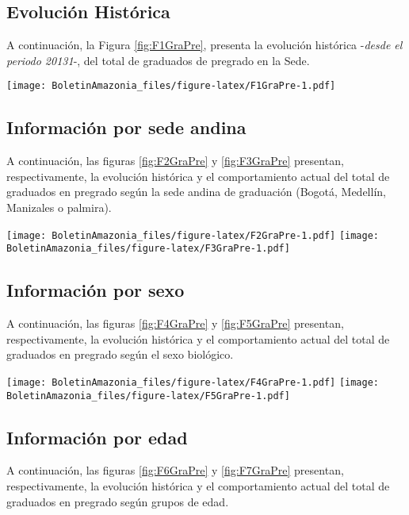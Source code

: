 \documentclass[
]{book}
\begin{document}
\hypertarget{evoluciuxf3n-histuxf3rica-8}{%
\subsection{Evolución Histórica}\label{evoluciuxf3n-histuxf3rica-8}}

A continuación, la Figura \ref{fig:F1GraPre}, presenta la evolución histórica -\emph{desde el periodo 20131}-, del total de graduados de pregrado en la Sede.

\texttt{[image: BoletinAmazonia\_files/figure-latex/F1GraPre-1.pdf]}

\hypertarget{informaciuxf3n-por-sede-andina-3}{%
\subsection{Información por sede andina}\label{informaciuxf3n-por-sede-andina-3}}

A continuación, las figuras \ref{fig:F2GraPre} y \ref{fig:F3GraPre} presentan, respectivamente, la evolución histórica y el comportamiento actual del total de graduados en pregrado según la sede andina de graduación (Bogotá, Medellín, Manizales o palmira).

\texttt{[image: BoletinAmazonia\_files/figure-latex/F2GraPre-1.pdf]}
\texttt{[image: BoletinAmazonia\_files/figure-latex/F3GraPre-1.pdf]}

\hypertarget{informaciuxf3n-por-sexo-8}{%
\subsection{Información por sexo}\label{informaciuxf3n-por-sexo-8}}

A continuación, las figuras \ref{fig:F4GraPre} y \ref{fig:F5GraPre} presentan, respectivamente, la evolución histórica y el comportamiento actual del total de graduados en pregrado según el sexo biológico.

\texttt{[image: BoletinAmazonia\_files/figure-latex/F4GraPre-1.pdf]}
\texttt{[image: BoletinAmazonia\_files/figure-latex/F5GraPre-1.pdf]}

\hypertarget{informaciuxf3n-por-edad-8}{%
\subsection{Información por edad}\label{informaciuxf3n-por-edad-8}}

A continuación, las figuras \ref{fig:F6GraPre} y \ref{fig:F7GraPre} presentan, respectivamente, la evolución histórica y el comportamiento actual del total de graduados en pregrado según grupos de edad.
\end{document}
